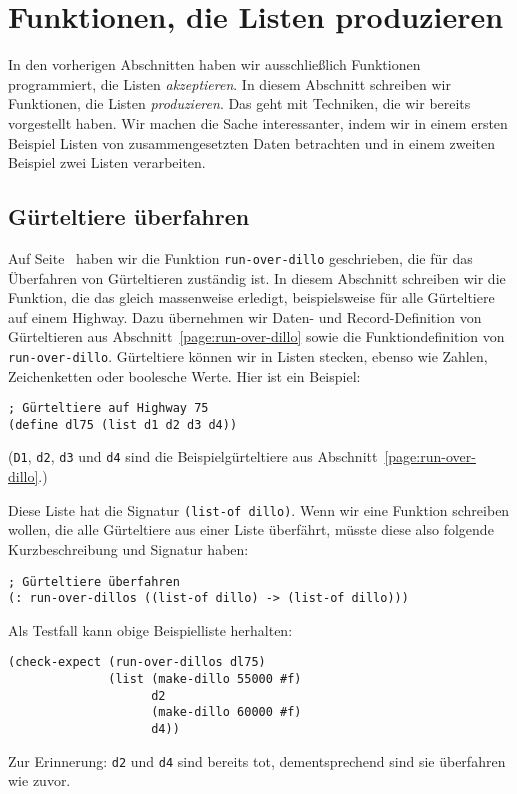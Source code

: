 \section{Funktionen, die Listen produzieren}

In den vorherigen Abschnitten haben wir ausschließlich Funktionen
programmiert, die Listen \emph{akzeptieren}.  In diesem Abschnitt
schreiben wir Funktionen, die Listen \emph{produzieren}.  Das geht mit
Techniken, die wir bereits vorgestellt haben.  Wir machen die Sache
interessanter, indem wir in einem ersten Beispiel Listen von
zusammengesetzten Daten betrachten und in einem zweiten Beispiel zwei
Listen verarbeiten.

\subsection{Gürteltiere überfahren}

Auf Seite~\pageref{page:run-over-dillo} haben wir die Funktion
\texttt{run-over-dillo} geschrieben, die für das Überfahren von
Gürteltieren zuständig ist.  In diesem Abschnitt schreiben wir die
Funktion, die das gleich massenweise erledigt, beispielsweise für alle
Gürteltiere auf einem Highway.  Dazu übernehmen wir Daten- und
Record-Definition von Gürteltieren aus
Abschnitt~\ref{page:run-over-dillo} sowie die Funktiondefinition von
\texttt{run-over-dillo}.  Gürteltiere können wir in Listen stecken,
ebenso wie Zahlen, Zeichenketten oder boolesche Werte.  Hier ist ein
Beispiel:
%
\begin{verbatim}
; Gürteltiere auf Highway 75
(define dl75 (list d1 d2 d3 d4))
\end{verbatim}
(\texttt{D1}, \texttt{d2}, \texttt{d3} und \texttt{d4} sind die
Beispielgürteltiere aus Abschnitt~\ref{page:run-over-dillo}.)

Diese Liste hat die Signatur \texttt{(list-of dillo)}.  Wenn wir eine
Funktion schreiben wollen, die alle Gürteltiere aus einer Liste
überfährt, müsste diese also folgende Kurzbeschreibung und Signatur
haben:
%
\begin{verbatim}
; Gürteltiere überfahren
(: run-over-dillos ((list-of dillo) -> (list-of dillo)))
\end{verbatim}
%
Als Testfall kann obige Beispielliste herhalten:
%
\begin{verbatim}
(check-expect (run-over-dillos dl75)
              (list (make-dillo 55000 #f)
                    d2
                    (make-dillo 60000 #f)
                    d4))
\end{verbatim}
%
Zur Erinnerung: \texttt{d2} und \texttt{d4} sind bereits tot,
dementsprechend sind sie überfahren wie zuvor.

